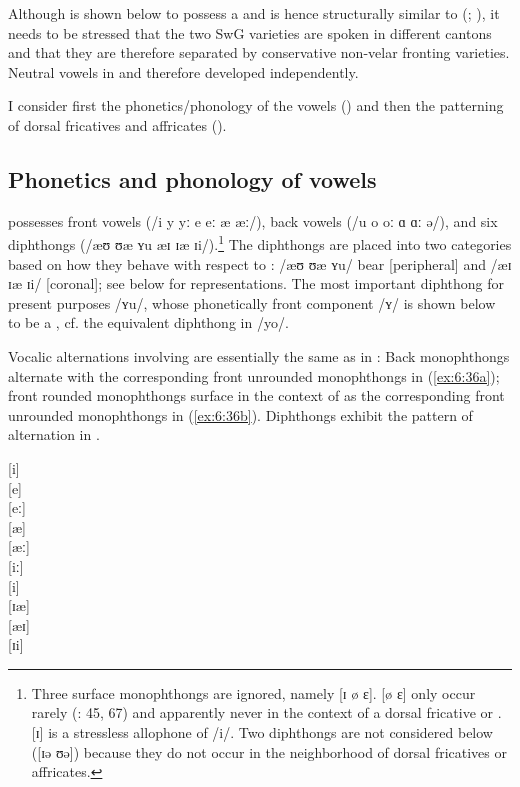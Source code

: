 Although  is shown below to possess a  and is hence structurally similar to  (\citealt{Wipf1910}; ), it needs to be stressed that the two SwG varieties are spoken in different cantons and that they are therefore separated by conservative non-velar fronting varieties. Neutral vowels in  and  therefore developed independently.

I consider first the phonetics/phonology of the vowels () and then the patterning of dorsal fricatives and affricates ().

\subsection{Phonetics and phonology of vowels}\label{sec:6.3.1}

 possesses front vowels (/i y yː e eː æ æː/), back vowels (/u o oː ɑ ɑː ə/), and six diphthongs (/æʊ ʊæ ʏu æɪ ɪæ ɪi/).\footnote{{Three surface monophthongs are ignored, namely [ɪ ø ɛ].  [ø ɛ] only occur rarely (\citealt{Brun1918}: 45, 67) and apparently never in the context of a dorsal fricative or . [ɪ] is a stressless allophone of /i/. Two diphthongs are not considered below ([ɪə ʊə]) because they do not occur in the neighborhood of dorsal fricatives or affricates.} } The diphthongs are placed into two categories based on how they behave with respect to : /æʊ ʊæ ʏu/ bear [peripheral] and /æɪ ɪæ ɪi/ [coronal]; see below for representations. The most important diphthong for present purposes /ʏu/, whose phonetically front component /ʏ/ is shown below to be a , cf. the equivalent diphthong in  /yo/.

Vocalic alternations involving  are essentially the same as in : Back monophthongs alternate with the corresponding front unrounded monophthongs in (\ref{ex:6:36a}); front rounded monophthongs surface in the context of  as the corresponding front unrounded monophthongs in (\ref{ex:6:36b}). Diphthongs exhibit the pattern of alternation in .

\ea%
    \label{ex:6:36}
\ea\label{ex:6:36a} \relax [u]{\textasciitilde}[i]  \\  
    \relax [o]{\textasciitilde}[e]  \\  
    \relax [oː]{\textasciitilde}[eː]\\
    \relax [ɑ]{\textasciitilde}[æ]  \\
    \relax [ɑː]{\textasciitilde}[æː]\\
\ex\label{ex:6:36b} \relax [yː]{\textasciitilde}[iː]\\
    \relax [y]{\textasciitilde}[i]  \\
\ex\label{ex:6:36c} \relax [ʊæ]{\textasciitilde}[ɪæ]\\
    \relax [æʊ]{\textasciitilde}[æɪ]\\
    \relax [ʏu]{\textasciitilde}[ɪi]\\
\z 
\z 

